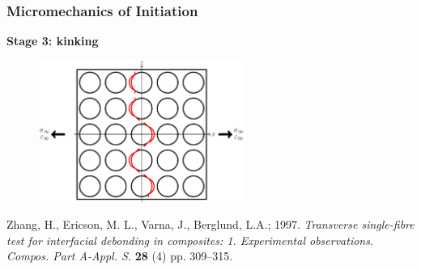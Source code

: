 \documentclass[first,firstsupp,lastsupp,last,hyperref,table]{ETHclass}
\begin{document}
\begin{frame}
\frametitle{\vspace{0.2cm}\small Micromechanics of Initiation}
\vspace{-0.5cm}
\centering
\begin{alertblock}{\centering\scriptsize\bf Stage 3: kinking}
\vspace{-0.25cm}
\begin{figure}
\centering
\includegraphics[width=0.6\textwidth]{stage3-kinking.pdf}
\end{figure}
\end{alertblock}
\vspace{-0.5cm}
{\tiny Zhang, H., Ericson, M. L., Varna, J., Berglund, L.A.; 1997. {\em\tiny Transverse single-fibre test for interfacial debonding in composites: 1. Experimental observations}. {\it\tiny Compos. Part A-Appl. S.} {\bf\tiny 28} (4) pp. 309--315.}
\end{frame}

\addtocounter{framenumber}{-1}
\end{document}
